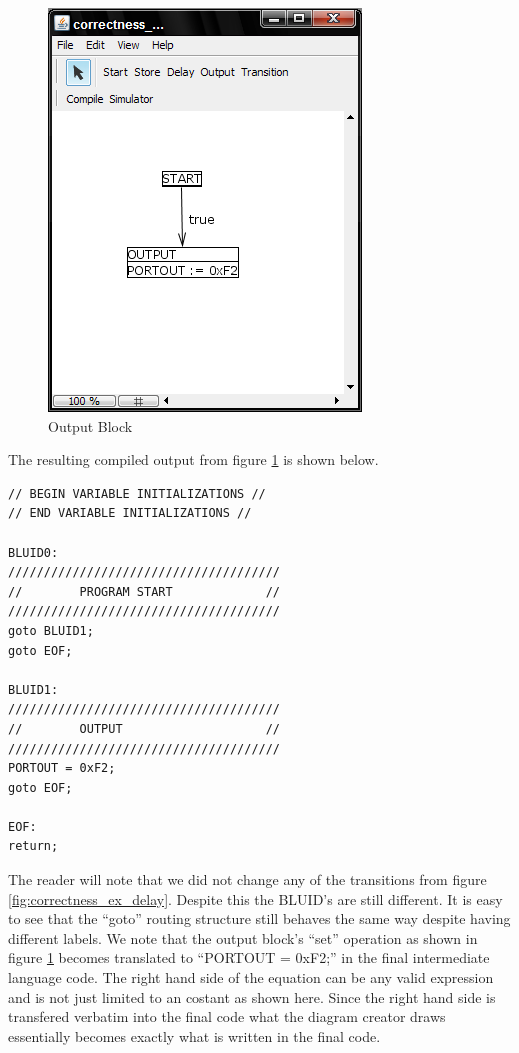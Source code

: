 \begin{figure}[htb]
	\centering
	\includegraphics[width=\imgmedphoto]{./images/correctness_ex_output.png}
	\caption{Output Block}
	\label{fig:correctness_ex_output}
\end{figure}

The resulting compiled output from figure \ref{fig:correctness_ex_output} is shown below.

\begin{minipage}{\textwidth}
\begin{lstlisting}[frame=single]
// BEGIN VARIABLE INITIALIZATIONS //
// END VARIABLE INITIALIZATIONS //

BLUID0:
//////////////////////////////////////
//        PROGRAM START             //
//////////////////////////////////////
goto BLUID1;
goto EOF;

BLUID1:
//////////////////////////////////////
//        OUTPUT                    //
//////////////////////////////////////
PORTOUT = 0xF2;
goto EOF;

EOF:
return;
\end{lstlisting}
\end{minipage}

The reader will note that we did not change any of the transitions from figure \ref{fig:correctness_ex_delay}. Despite this the BLUID's are still different. It is easy to see that the ``goto'' routing structure still behaves the same way despite having different labels. We note that the output block's ``set'' operation as shown in figure \ref{fig:correctness_ex_output} becomes translated to ``PORTOUT = 0xF2;'' in the final intermediate language code. The right hand side of the equation can be any valid expression and is not just limited to an costant as shown here. Since the right hand side is transfered verbatim into the final code what the diagram creator draws essentially becomes exactly what is written in the final code.

